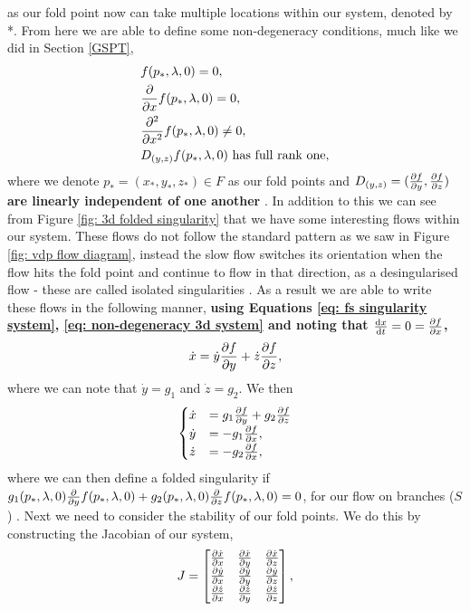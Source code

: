 as our fold point now can take multiple locations within our system, denoted by *. From here we are able to define some non-degeneracy conditions, much like we did in Section \ref{GSPT},
\begin{equation}
\begin{aligned}
&f(p_*,\lambda,0)=0,\\
&\pd{}{x}f(p_*,\lambda,0)=0,\\
&\pd{^2}{x^2}f(p_*,\lambda,0)\neq 0,\\
&D_{(y,z)}f(p_*,\lambda,0) \ \text{has full rank one},
\end{aligned}
\label{eq: non-degeneracy 3d system}	
\end{equation}
where we denote $ p_*=(x_*,y_*,z_*)\in F $ as our fold points and\textbf{ $ D_{(y,z)}=(\pd{f}{y},\pd{f}{z}) $ are linearly independent of one another } \citep{MMO}. In addition to this we can see from Figure \ref{fig: 3d folded singularity} that we have some interesting flows within our system. These flows do not follow the standard pattern as we saw in Figure \ref{fig: vdp flow diagram}, instead the slow flow switches its orientation when the flow hits the fold point and continue to flow in that direction, as a desingularised flow - these are called isolated singularities \citep{MMO}. %
As a result we are able to write these flows in the following manner, \textbf{using Equations \ref{eq: fs singularity system}, \ref{eq: non-degeneracy 3d system} and noting that $ \od{x}{t}=0=\pd{f}{x} $,  }
\begin{equation}
\dot{x}=\dot{y}\pd{f}{y}+\dot{z}\pd{f}{z},
\end{equation}
where we can note that $ \dot{y}=g_1 $ and $ \dot{z}=g_2 $. We then \\


\begin{equation}
\begin{cases}
\dot{x}&=g_1\pd{f}{y}+g_2\pd{f}{z}\\
\dot{y}&=-g_1\pd{f}{x},\\
\dot{z}&=-g_2\pd{f}{x},
\end{cases}
\end{equation}
where we can then define a folded singularity if $ g_1(p_*,\lambda,0)\pd{}{y}f(p_*,\lambda,0)+g_2(p_*,\lambda,0)\pd{}{z}f(p_*,\lambda,0)=0 $, for our flow on branches ($ S $) \citep{MMO}. Next we need to consider the stability of our fold points. We do this by constructing the Jacobian of our system, 
\begin{equation}
J=\begin{bmatrix}
\pd{\dot{x}}{x}&\pd{\dot{x}}{y}&\pd{\dot{x}}{z}\\
\pd{\dot{y}}{x}&\pd{\dot{y}}{y}&\pd{\dot{y}}{z}\\
\pd{\dot{z}}{x}&\pd{\dot{z}}{y}&\pd{\dot{z}}{z}\\
\end{bmatrix},
\end{equation}


